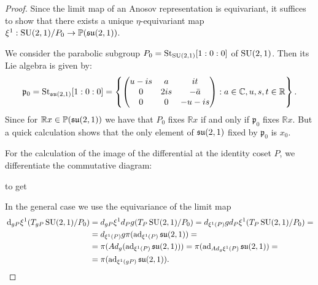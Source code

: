 \documentclass{report}
\begin{document}
\begin{proof}
Since the limit map of an Anosov representation is equivariant, it suffices to show that there exists a unique $\eta$-equivariant map $\xi^1:\operatorname{{\mathrm{SU}}}(2,1)/P_0 \to \mathbb P(\mathfrak{su}(2,1))$.

We consider the parabolic subgroup $P_0 = \mathrm{St}_{\operatorname{{\mathrm{SU}}}(2,1)} [1:0:0]$ of $\operatorname{{\mathrm{SU}}}(2,1)$.
Then its Lie algebra is given by:
\[
\mathfrak p_0 = \mathrm{St}_{\operatorname{{\mathfrak{su}}}(2,1)}[1:0:0] = \left\{ \begin{pmatrix} u - is & a & i t \\ 0 & 2is & - \bar a \\ 0 & 0 & -u - is \end{pmatrix} : a \in \mathbb C, u,s,t \in \mathbb R \right\}.
\]
Since for $\mathbb R x \in \mathbb P(\operatorname{{\mathfrak{su}}}(2,1))$ we have that $P_0$ fixes $\mathbb R x$ if and only if $\mathfrak p_0$ fixes $\mathbb R x$.
But a quick calculation shows that the only element of $\operatorname{{\mathfrak{su}}}(2,1)$ fixed by $\mathfrak p_0$ is $x_0$.

For the calculation of the image of the differential at the identity coset $P$, we differentiate the commutative diagram:

to get

In the general case we use the equivariance of the limit map
\begin{align*}
    \,\mathrm{d}_{gP} \xi^1 (T_{gP} \operatorname{{\mathrm{SU}}}(2,1)/P_0) &=
    d_{gP} \xi^1 d_P g (T_P \operatorname{{\mathrm{SU}}}(2,1)/P_0) =
    d_{\xi^1(P)} g d_P \xi^1 (T_P \operatorname{{\mathrm{SU}}}(2,1)/P_0) =\\
    &= d_{\xi^1(P)} g \pi(\operatorname{ad}_{\xi^1(P)} \operatorname{{\mathfrak{su}}}(2,1)) =\\
    &= \pi(Ad_g(\operatorname{ad}_{\xi^1(P)} \operatorname{{\mathfrak{su}}}(2,1))) = \pi(\operatorname{ad}_{Ad_g \xi^1(P)} \operatorname{{\mathfrak{su}}}(2,1))=\\
    &= \pi(\operatorname{ad}_{\xi^1(gP)} \operatorname{{\mathfrak{su}}}(2,1)).
\end{align*}
\end{proof}
\end{document}
